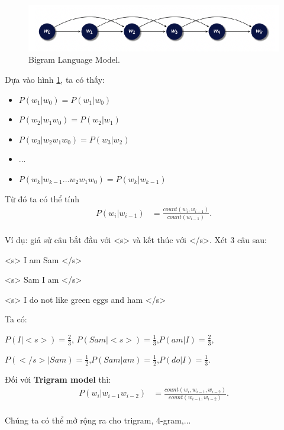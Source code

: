 \begin{figure}[H]
    \centering
    \includegraphics[width=13cm]{books/artificial-neural-network/chapter07/figure-sec12/bigram.png}
    \caption{Bigram Language Model.}
    \label{fig:bigram}
\end{figure}

Dựa vào hình \ref{fig:bigram}, ta có thấy:
\begin{itemize}
    \item $P(w_1|w_0)=P(w_1|w_0)$
    \item $P(w_2|w_1w_0)=P(w_2|w_1)$
    \item $P(w_3|w_2w_1w_0)=P(w_3|w_2)$
    \item ...
    \item $P(w_k|w_{k-1}...w_2w_1w_0)=P(w_k|w_{k-1})$
\end{itemize}

Từ đó ta có thể tính
\begin{equation}
\begin{split}
P(w_i|w_{i-1})&=\frac{count(w_i,w_{i-1})}{count(w_{i-1})}.\\
\end{split}
\end{equation}

Ví dụ: giả sử câu bắt đầu với <s> và kết thúc với </s>. Xét 3 câu sau:

<s> I am Sam </s>

<s> Sam I am </s>

<s> I do not like green eggs and ham </s>

Ta có:

$P(I|<s>)=\frac{2}{3}$, $P(Sam|<s>)=\frac{1}{3}$,$P(am|I)=\frac{2}{3}$,

$P(</s>|Sam)=\frac{1}{2}$,$P(Sam|am)=\frac{1}{2}$,$P(do|I)=\frac{1}{3}$.

Đối với \textbf{Trigram model} thì:
\begin{equation}
\begin{split}
P(w_i|w_{i-1}w_{i-2})&=\frac{count(w_i,w_{i-1},w_{i-2})}{count(w_{i-1},w_{i-2})}.\\
\end{split}
\end{equation}

Chúng ta có thể mở rộng ra cho trigram, 4-gram,...


